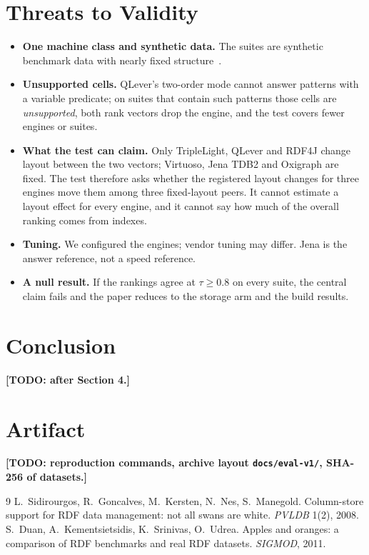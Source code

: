 \documentclass[11pt]{article}
\newcommand{\todo}[1]{\textbf{[TODO: #1]}}
\begin{document}
\section{Threats to Validity}
\begin{itemize}
  \item \textbf{One machine class and synthetic data.} The suites are synthetic benchmark data with nearly fixed structure~\cite{duan2011}.
  \item \textbf{Unsupported cells.} QLever's two-order mode cannot answer patterns with a variable predicate; on suites that contain
  such patterns those cells are \emph{unsupported}, both rank vectors drop the engine, and the test covers fewer engines or suites.
  \item \textbf{What the test can claim.} Only TripleLight, QLever and RDF4J change layout between the two vectors; Virtuoso, Jena TDB2 and Oxigraph are fixed. The test therefore asks whether the registered layout changes for three engines move them among three fixed-layout peers. It cannot estimate a layout effect for every engine, and it cannot say how much of the overall ranking comes from indexes.
  \item \textbf{Tuning.} We configured the engines; vendor tuning may differ. Jena is the answer reference, not a speed reference.
  \item \textbf{A null result.} If the rankings agree at $\tau \ge 0.8$ on every suite, the central claim fails and the paper reduces to the storage
  arm and the build results.
\end{itemize}

\section{Conclusion}
\todo{after Section 4.}

\appendix
\section{Artifact}
\todo{reproduction commands, archive layout \texttt{docs/eval-v1/}, SHA-256 of datasets.}

\begin{thebibliography}{9}
 L.~Sidirourgos, R.~Goncalves, M.~Kersten, N.~Nes, S.~Manegold. Column-store support for RDF data management: not all swans are white. \emph{PVLDB} 1(2), 2008.
 S.~Duan, A.~Kementsietsidis, K.~Srinivas, O.~Udrea. Apples and oranges: a comparison of RDF benchmarks and real RDF datasets. \emph{SIGMOD}, 2011.
\end{thebibliography}
\end{document}
